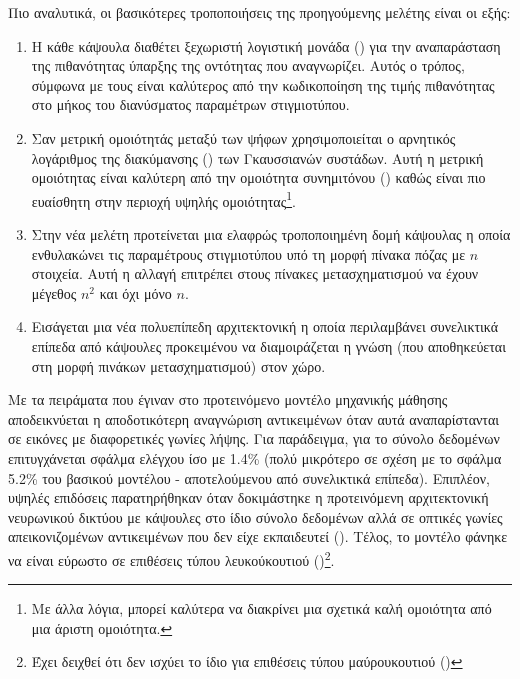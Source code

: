 Πιο αναλυτικά, οι βασικότερες τροποποιήσεις της προηγούμενης μελέτης είναι οι εξής:
\begin{enumerate}
    \item Η κάθε κάψουλα διαθέτει ξεχωριστή λογιστική μονάδα () για την αναπαράσταση της πιθανότητας ύπαρξης της οντότητας που αναγνωρίζει. Αυτός ο τρόπος, σύμφωνα με τους \cite{hinton2018matrix} είναι καλύτερος από την κωδικοποίηση της τιμής πιθανότητας στο μήκος του διανύσματος παραμέτρων στιγμιοτύπου.
    \item Σαν μετρική ομοιότητάς μεταξύ των ψήφων χρησιμοποιείται ο αρνητικός λογάριθμος της διακύμανσης () των Γκαυσσιανών συστάδων. Αυτή η μετρική ομοιότητας είναι καλύτερη από την ομοιότητα συνημιτόνου () καθώς είναι πιο ευαίσθητη στην περιοχή υψηλής ομοιότητας\footnote{Με άλλα λόγια, μπορεί καλύτερα να διακρίνει μια σχετικά καλή ομοιότητα από μια άριστη ομοιότητα.}.
    \item Στην νέα μελέτη προτείνεται μια ελαφρώς τροποποιημένη δομή κάψουλας η οποία ενθυλακώνει τις παραμέτρους στιγμιοτύπου υπό τη μορφή πίνακα πόζας με $n$ στοιχεία. Αυτή η αλλαγή επιτρέπει στους πίνακες μετασχηματισμού να έχουν μέγεθος $n^2$ και όχι μόνο $n$.
    \item Εισάγεται μια νέα πολυεπίπεδη αρχιτεκτονική η οποία περιλαμβάνει συνελικτικά επίπεδα από κάψουλες προκειμένου να διαμοιράζεται η γνώση (που αποθηκεύεται στη μορφή πινάκων μετασχηματισμού) στον χώρο.
\end{enumerate}\par

Με τα πειράματα που έγιναν στο προτεινόμενο μοντέλο μηχανικής μάθησης αποδεικνύεται η αποδοτικότερη αναγνώριση αντικειμένων όταν αυτά αναπαρίστανται σε εικόνες με διαφορετικές γωνίες λήψης. Για παράδειγμα, για το σύνολο δεδομένων  επιτυγχάνεται σφάλμα ελέγχου ίσο με 1.4\% (πολύ μικρότερο σε σχέση με το σφάλμα 5.2\% του βασικού μοντέλου - αποτελούμενου από συνελικτικά επίπεδα). Επιπλέον, υψηλές επιδόσεις παρατηρήθηκαν όταν δοκιμάστηκε η προτεινόμενη αρχιτεκτονική νευρωνικού δικτύου με κάψουλες στο ίδιο σύνολο δεδομένων αλλά σε οπτικές γωνίες απεικονιζομένων αντικειμένων που δεν είχε εκπαιδευτεί (). Τέλος, το μοντέλο φάνηκε να είναι εύρωστο σε επιθέσεις τύπου λευκού\textendash κουτιού ()\cite{goodfellow2014explaining}\footnote{Έχει δειχθεί ότι δεν ισχύει το ίδιο για επιθέσεις τύπου μαύρου\textendash κουτιού ()}. 


